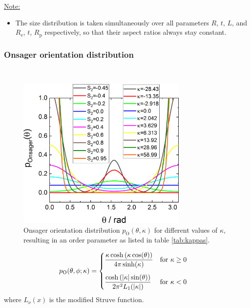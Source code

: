 \vspace{5mm}

\uline{Note:}
\begin{itemize}
\item The size distribution is taken simultaneously over all parameters $R$, $t$, $L$, and $R_\mathrm{e}$, $t$, $R_\mathrm{p}$ respectively, so that their aspect ratios always stay constant.
\end{itemize}

\newpage
\subsubsection{Onsager orientation distribution} ~\\

\begin{figure}[htb]
\includegraphics[width=0.75\textwidth]{../images/form_factor/cylindrical_obj/pOnsagerGr.png}
\caption{Onsager orientation distribution $p_\mathrm{O}(\theta,\kappa)$ for different values of $\kappa$, resulting in an order parameter as listed in table \ref{tab:kappas}.}
\label{fig:pOnsagerGr}
\end{figure}

\begin{align}
p_\mathrm{O}(\theta,\phi;\kappa) & =
\begin{cases} \displaystyle
\frac{\kappa \cosh\left(\kappa \cos(\theta)\right)}{4\pi \sinh(\kappa)}      &\mathrm{for~} \kappa \geq 0 \\[5mm]
 \displaystyle
\frac{\cosh\left(\abs{\kappa} \sin(\theta)\right)}{2\pi^2 L_1(\abs{\kappa})}  &\mathrm{for~} \kappa < 0
\end{cases}
\end{align}
where $L_\nu(x)$ is the modified Struve function.

